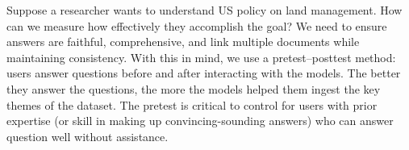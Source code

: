 





Suppose a researcher wants to
understand US policy on land management. How can we measure how
effectively they accomplish the goal?
%
%
We need to ensure answers are faithful, comprehensive, and link
multiple documents while maintaining consistency.
%
With this in mind, we use a pretest--posttest method: users
answer questions before and after interacting with the models.
%
The better they answer the questions, the more the models helped them
ingest the key themes of the dataset.
%
The pretest is critical to control for users with prior expertise (or
skill in making up convincing-sounding answers) who can answer
question well without assistance.



